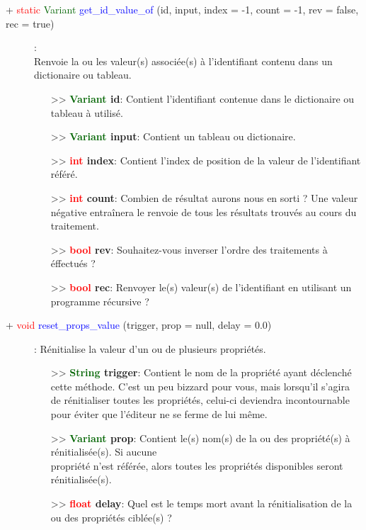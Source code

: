 \documentclass[a4paper, 11pt]{article}
\begin{document}
	\begin{description}
		\item [+ \textcolor{red}{static} \textcolor{darkgreen}{Variant} \textcolor{blue}{get\_id\_value\_of} 
		(id, input, index = -1, count = -1, rev = false, rec = true)]: \\Renvoie la ou les valeur(s) 
		associée(s) à l'identifiant contenu dans un dictionaire ou tableau.
		\begin{itemize}
			\item[>> \textbf{\textcolor{darkgreen}{Variant} id}:] Contient l'identifiant contenue dans le 
			dictionaire ou tableau à utilisé.
			\item[>> \textbf{\textcolor{darkgreen}{Variant} input}:] Contient un tableau ou dictionaire.
			\item[>> \textbf{\textcolor{red}{int} index}:] Contient l'index de position de la valeur de 
			l'identifiant référé.
			\item[>> \textbf{\textcolor{red}{int} count}:] Combien de résultat aurons nous en sorti ? Une
			valeur négative entraînera le renvoie de tous les résultats trouvés au cours du traitement.
			\item[>> \textbf{\textcolor{red}{bool} rev}:] Souhaitez-vous inverser l'ordre des traitements à
			éffectués ?
			\item [>> \textbf{\textcolor{red}{bool} rec}:] Renvoyer le(s) valeur(s) de l'identifiant en
			utilisant un programme récursive ?\\
		\end{itemize}
	\end{description}
	\begin{description}
		\item [+ \textcolor{red}{void} \textcolor{blue}{reset\_props\_value} (trigger, prop = null, delay = 
		0.0)]: Rénitialise la valeur d'un ou de plusieurs propriétés.
		\begin{itemize}
			\item[>> \textbf{\textcolor{darkgreen}{String} trigger}:] Contient le nom de la propriété ayant
			déclenché cette méthode. C'est un peu bizzard pour vous, mais lorsqu'il s'agira de rénitialiser 
			toutes les propriétés, celui-ci deviendra incontournable pour éviter que l'éditeur ne se ferme 
			de lui même.
			\item[>> \textbf{\textcolor{darkgreen}{Variant} prop}:] Contient le(s) nom(s) de la ou des 
			propriété(s) à rénitialisée(s). Si aucune \\propriété n'est référée, alors toutes les propriétés
			disponibles seront rénitialisée(s).
			\item[>> \textbf{\textcolor{red}{float} delay}:] Quel est le temps mort avant la 
			rénitialisation de la ou des propriétés ciblée(s) ?\\
		\end{itemize}
	\end{description}
\end{document}
